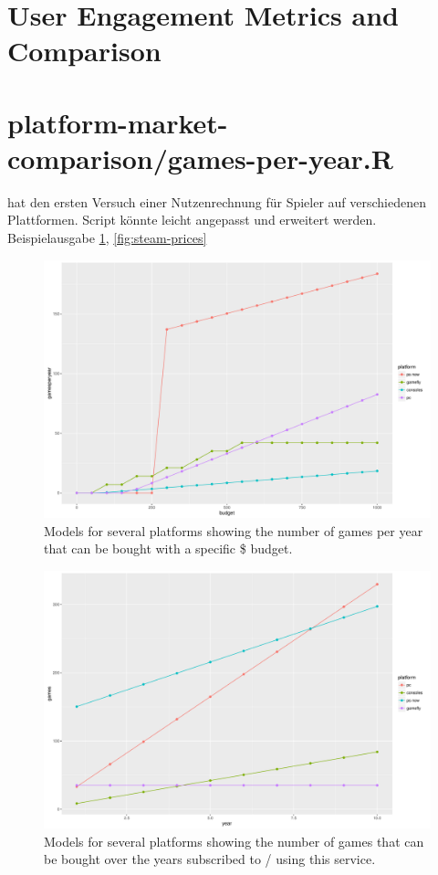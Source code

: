 \section{User Engagement Metrics and Comparison}



\section{platform-market-comparison/games-per-year.R}

 hat den ersten Versuch einer Nutzenrechnung für Spieler auf verschiedenen Plattformen. Script könnte leicht angepasst und erweitert werden. Beispielausgabe \ref{fig:gamesperyear-over-budget}, \ref{fig:steam-prices}

\begin{figure}[!t]
	\centering
	\includegraphics[width=1.0\columnwidth]{images/gamesperyear-over-budget.pdf}
	\caption{Models for several platforms showing the number of games per year that can be bought with a specific \$ budget.}
\label{fig:gamesperyear-over-budget}
\end{figure}

\begin{figure}[!t]
	\centering
	\includegraphics[width=1.0\columnwidth]{images/games-over-year.pdf}
	\caption{Models for several platforms showing the number of games that can be bought over the years subscribed to / using this service.}
\label{fig:games-over-years}
\end{figure}



